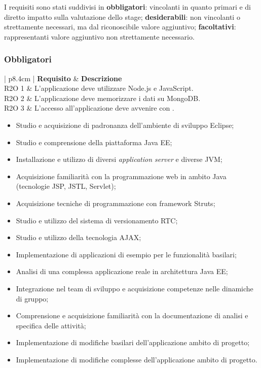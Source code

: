 	 I requisiti sono stati suddivisi in \textbf{obbligatori}: vincolanti in quanto primari e di diretto impatto sulla valutazione dello stage; \textbf{desiderabili}: non vincolanti o strettamente necessari, ma dal riconoscibile valore aggiuntivo; \textbf{facoltativi}: rappresentanti valore aggiuntivo non strettamente necessario.
	
	\subsubsection{Obbligatori}
		\begin{center}
		  \bgroup
		  \def\arraystretch{1.8}
		  \begin{longtable}{ | p{8.4cm} |}
		    \hline
		     \textbf{Requisito} &  \textbf{Descrizione} \\ \hline
		    R2O 1 & L'applicazione deve utilizzare Node.js e JavaScript. \\ \hline
		    R2O 2 & L'applicazione deve memorizzare i dati su MongoDB. \\ \hline
		    R2O 3 & L'accesso all'applicazione deve avvenire con . \\ \hline
		    \caption[Requisiti di vincolo]{Requisiti di vincolo}
		    \label{tab:reqvincolo} 
		    \end{longtable}
		  \egroup
		\end{center} 			
		\begin{itemize}
			\item Studio e acquisizione di padronanza dell'ambiente di sviluppo Eclipse;
			\item Studio e comprensione della piattaforma Java EE;
			\item Installazione e utilizzo di diversi \textit{application server} e diverse JVM;
			\item Acquisizione familiarità con la programmazione web in ambito Java (tecnologie JSP, JSTL, Servlet\glossario );
			\item Acquisizione tecniche di programmazione con framework Struts;
			\item Studio e utilizzo del sistema di versionamento RTC;
			\item Studio e utilizzo della tecnologia AJAX\glossario ;
			\item Implementazione di applicazioni di esempio per le funzionalità basilari;
			\item Analisi di una complessa applicazione reale in architettura Java EE;
			\item Integrazione nel team di sviluppo e acquisizione competenze nelle dinamiche di gruppo;
			\item Comprensione e acquisizione familiarità con la documentazione di analisi e specifica delle attività;
			\item Implementazione di modifiche basilari dell'applicazione ambito di progetto;
			\item Implementazione di modifiche complesse dell'applicazione ambito di progetto.
		\end{itemize}
		
